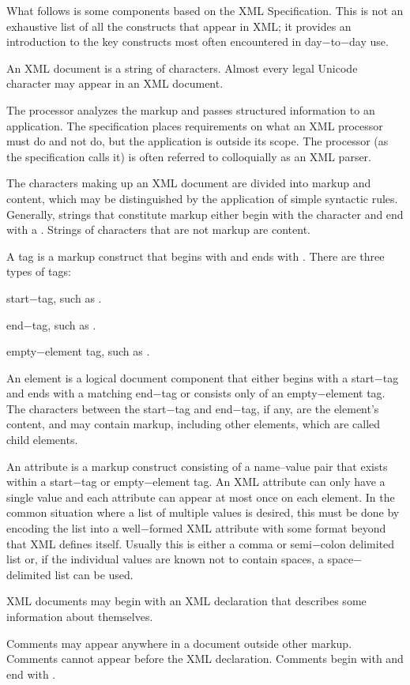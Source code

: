 What follows is some components based on the XML Specification. This is not an exhaustive list of all the constructs
that appear in XML; it provides an introduction to the key constructs most often encountered in day$-$to$-$day use.
\bit
\item An XML document is a string of characters. Almost every legal Unicode character may appear in an XML document.
\item The processor analyzes the markup and passes structured information to an application. The specification places
requirements on what an XML processor must do and not do, but the application is outside its scope. The processor (as
the specification calls it) is often referred to colloquially as an XML parser.
\item The characters making up an XML document are divided into markup and content, which may be distinguished by the
application of simple syntactic rules. Generally, strings that constitute markup either begin with the character
\code{<} and end with a \code{>}. Strings of characters that are not markup are content.
\item A tag is a markup construct that begins with \code{<} and ends with \code{>}. There are three types of tags:
\bit
\item start$-$tag, such as .
\item end$-$tag, such as .
\item empty$-$element tag, such as .
\eit
\item An element is a logical document component that either begins with a start$-$tag and ends with a matching
end$-$tag or consists only of an empty$-$element tag. The characters between the start$-$tag and end$-$tag, if any,
are the element's content, and may contain markup, including other elements, which are called child elements.
\item An attribute is a markup construct consisting of a name–value pair that exists within a start$-$tag or
empty$-$element tag. An XML attribute can only have a single value and each attribute can appear at most once on each
element. In the common situation where a list of multiple values is desired, this must be done by encoding the list
into a well$-$formed XML attribute with some format beyond that XML defines itself. Usually this is either a comma or
semi$-$colon delimited list or, if the individual values are known not to contain spaces, a space$-$delimited list
can be used.
\item XML documents may begin with an XML declaration that describes some information about themselves.
\item Comments may appear anywhere in a document outside other markup. Comments cannot appear before the XML
declaration. Comments begin with \code{$<!--$} and end with \code{$-->$}.
\eit

